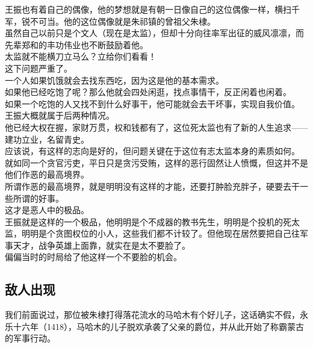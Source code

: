 \begin{multicols}{\theparacolNo}
王振也有着自己的偶像，他的梦想就是有朝一日像自己的这位偶像一样，横扫千军，锐不可当。他的这位偶像就是朱祁镇的曾祖父朱棣。\\

虽然自己以前只是个文人（现在是太监），但却十分向往率军出征的威风凛凛，而先辈郑和的丰功伟业也不断鼓励着他。\\

太监就不能横刀立马么？立给你们看看！\\

这下问题严重了。\\

一个人如果饥饿就会去找东西吃，因为这是他的基本需求。\\

如果他已经吃饱了呢？那么他就会四处闲逛，找点事情干，反正闲着也闲着。\\

如果一个吃饱的人又找不到什么好事干，他可能就会去干坏事，实现自我价值。\\

王振大概就属于后两种情况。\\

他已经大权在握，家财万贯，权和钱都有了，这位死太监也有了新的人生追求——建功立业，名留青史。\\

应该说，有这样的志向是好的，但问题关键在于这位有志太监本身的素质如何。\\

就如同一个贪官污吏，平日只是贪污受贿，这样的恶行固然让人愤慨，但这并不是他们作恶的最高境界。\\

所谓作恶的最高境界，就是明明没有这样的才能，还要打肿脸充胖子，硬要去干一些所谓的好事。\\

这才是恶人中的极品。\\

王振就是这样的一个极品，他明明是个不成器的教书先生，明明是个投机的死太监，明明是个贪图权位的小人，这些我们都不计较了。但他现在居然要把自己往军事天才，战争英雄上面靠，就实在是太不要脸了。\\

偏偏当时的时局给了他这样一个不要脸的机会。\\

\subsection{敌人出现}
我们前面说过，那位被朱棣打得落花流水的马哈木有个好儿子，这话确实不假，永乐十六年（1418），马哈木的儿子脱欢承袭了父亲的爵位，并从此开始了称霸蒙古的军事行动。\\


\end{multicols}
